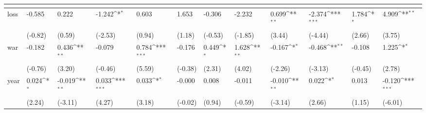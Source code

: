 \def\sym#1{\ifmmode^{#1}\else\(^{#1}\)\fi}
\begin{tabular}{p{1.5cm} p{2cm} p{1.7cm} p{1.7cm} p{1.7cm} p{1.7cm} p{1.7cm} p{1.7cm} p{1.7cm} p{1.7cm} p{1.7cm} p{1.7cm}}
                &&&&&&&&&&&\\
\hline
loss            &   -0.585         &    0.222         &   -1.242\sym{*}  &    0.603         &    1.653         &   -0.306         &   -2.232         &    0.699\sym{**} &   -2.374\sym{***}&    1.784\sym{*}  &    4.909\sym{**} \\
                &  (-0.82)         &   (0.59)         &  (-2.53)         &   (0.94)         &   (1.18)         &  (-0.53)         &  (-1.85)         &   (3.44)         &  (-4.44)         &   (2.66)         &   (3.75)         \\
war             &   -0.182         &    0.436\sym{**} &   -0.079         &    0.784\sym{***}&   -0.176         &    0.449\sym{*}  &    1.628\sym{**} &   -0.167\sym{*}  &   -0.468\sym{**} &   -0.108         &    1.225\sym{*}  \\
                &  (-0.76)         &   (3.20)         &  (-0.46)         &   (5.59)         &  (-0.38)         &   (2.31)         &   (4.02)         &  (-2.26)         &  (-3.13)         &  (-0.45)         &   (2.78)         \\
year            &    0.024\sym{*}  &   -0.019\sym{**} &    0.033\sym{***}&    0.033\sym{*}  &   -0.000         &    0.008         &   -0.011         &   -0.010\sym{**} &    0.022\sym{*}  &    0.013         &   -0.120\sym{***}\\
                &   (2.24)         &  (-3.11)         &   (4.27)         &   (3.18)         &  (-0.02)         &   (0.94)         &  (-0.59)         &  (-3.14)         &   (2.66)         &   (1.15)         &  (-6.01)         \\
\end{tabular}
